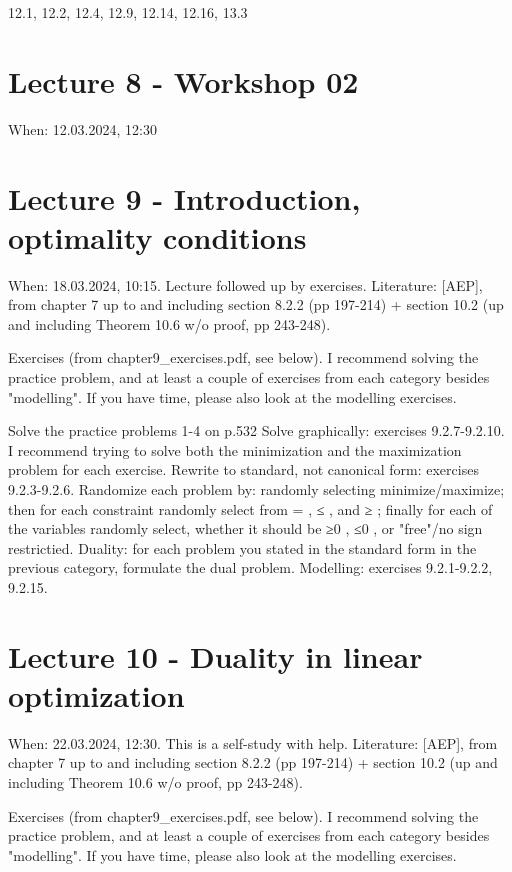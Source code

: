 \documentclass{article}
\begin{document}
{{{{{{{{{{{{12.1, 12.2, 12.4, 12.9, 12.14, 12.16, 13.3

\section*{Lecture 8 - Workshop 02}

When: 12.03.2024, 12:30

\section*{Lecture 9 - Introduction, optimality conditions}

When: 18.03.2024, 10:15. Lecture followed up by exercises.
Literature: [AEP], from chapter 7 up to and including section 8.2.2 (pp 197-214) + section 10.2 (up and including Theorem 10.6 w/o proof, pp 243-248).

Exercises (from chapter9_exercises.pdf, see below). I recommend solving the practice problem, and at least a couple of exercises from each category besides "modelling". If you have time, please also look at the modelling exercises.

Solve the practice problems 1-4 on p.532
Solve graphically: exercises 9.2.7-9.2.10. I recommend trying to solve both the minimization and the maximization problem for each exercise.
Rewrite to standard, not canonical form: exercises 9.2.3-9.2.6. Randomize each problem by: randomly selecting minimize/maximize; then for each constraint randomly select from =
, ≤
, and ≥
; finally for each of the variables randomly select, whether it should be ≥0
, ≤0
, or "free"/no sign restrictied.
Duality: for each problem you stated in the standard form in the previous category, formulate the dual problem.
Modelling: exercises 9.2.1-9.2.2, 9.2.15.

\section*{Lecture 10 - Duality in linear optimization}

When: 22.03.2024, 12:30. This is a self-study with help.
Literature: [AEP], from chapter 7 up to and including section 8.2.2 (pp 197-214) + section 10.2 (up and including Theorem 10.6 w/o proof, pp 243-248).

Exercises (from chapter9_exercises.pdf, see below). I recommend solving the practice problem, and at least a couple of exercises from each category besides "modelling". If you have time, please also look at the modelling exercises.

}}}}}}}}}}}}
\end{document}
